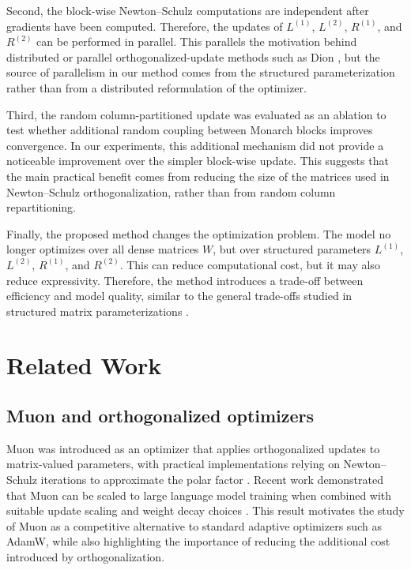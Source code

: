 \documentclass{article}
\begin{document}
Second, the block-wise Newton--Schulz computations are independent after gradients have been computed. Therefore, the updates of \(L^{(1)}\), \(L^{(2)}\), \(R^{(1)}\), and \(R^{(2)}\) can be performed in parallel. This parallels the motivation behind distributed or parallel orthogonalized-update methods such as Dion \cite{ahn2025diondistributedorthonormalizedupdates}, but the source of parallelism in our method comes from the structured parameterization rather than from a distributed reformulation of the optimizer.

Third, the random column-partitioned update was evaluated as an ablation to test whether additional random coupling between Monarch blocks improves convergence. In our experiments, this additional mechanism did not provide a noticeable improvement over the simpler block-wise update. This suggests that the main practical benefit comes from reducing the size of the matrices used in Newton--Schulz orthogonalization, rather than from random column repartitioning.

Finally, the proposed method changes the optimization problem. The model no longer optimizes over all dense matrices \(W\), but over structured parameters \(L^{(1)}\), \(L^{(2)}\), \(R^{(1)}\), and \(R^{(2)}\). This can reduce computational cost, but it may also reduce expressivity. Therefore, the method introduces a trade-off between efficiency and model quality, similar to the general trade-offs studied in structured matrix parameterizations \cite{dao2022monarchexpressivestructuredmatrices}.

\section{Related Work}\label{sec:rw}

\subsection{Muon and orthogonalized optimizers}

Muon was introduced as an optimizer that applies orthogonalized updates to matrix-valued parameters, with practical implementations relying on Newton--Schulz iterations to approximate the polar factor \cite{jordan2024muon}. Recent work demonstrated that Muon can be scaled to large language model training when combined with suitable update scaling and weight decay choices \cite{liu2025muonscalablellmtraining}. This result motivates the study of Muon as a competitive alternative to standard adaptive optimizers such as AdamW, while also highlighting the importance of reducing the additional cost introduced by orthogonalization.
\end{document}
